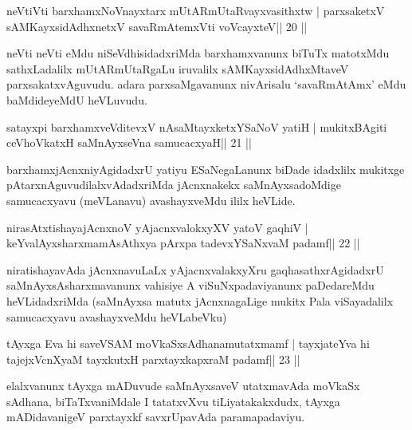 \begin{shl}
neVtiVti barxhamxNoV\s nayxtarx mUtARmUtaRvayxvasithxtw |
parxsaketxV sAMKayxsidAdhxnetxV savaRmAtemxVti voVcayxteV\hfill || 20 ||
\end{shl}

\begin{artha}
neVti neVti eMdu niSeVdhisidadxriMda barxhamxvanunx biTuTx matotxMdu sathxLadalilx mUtARmUtaRgaLu iruvalilx sAMKayxsidAdhxMtaveV parxsakatxvAguvudu. adara parxsaMgavanunx nivArisalu `savaRmAtAmx' eMdu baMdideyeMdU heVLuvudu.
\end{artha}


\begin{shl}
satayxpi barxhamxveVditevxV nAsaMtayxketxYSaNoV yatiH |
mukitxBAgiti ceVhoVkatxH saMnAyxseVna samucacxyaH\hfill || 21 ||
\end{shl}

\begin{artha}
barxhamxjAcnxniyAgidadxrU yatiyu ESaNegaLanunx biDade idadxlilx mukitxge pAtarxnAguvudilalxvAdadxriMda jAcnxnakekx saMnAyxsadoMdige samucacxyavu (meVLanavu) avashayxveMdu ililx heVLide.
\end{artha}

\begin{shl}
nirasAtxtishayajAcnxnoV yAjacnxvalokxyXV yatoV gaqhiV |
keYvalAyxsharxmamAsAthxya pArxpa tadevxYSaNxvaM padamf\hfill || 22 ||
\end{shl}

\begin{artha}
niratishayavAda jAcnxnavuLaLx yAjacnxvalakxyXru gaqhasathxrAgidadxrU
saMnAyxsAsharxmavanunx vahisiye A viSuNxpadaviyanunx paDedareMdu
heVLidadxriMda (saMnAyxsa matutx jAcnxnagaLige mukitx Pala
viSayadalilx samucacxyavu avashayxveMdu heVLabeVku)
\end{artha}


\begin{shl}
tAyxga Eva hi saveVSAM moVkaSxsAdhanamutatxmamf |
tayxjateYva hi tajejxVcnXyaM tayxkutxH parxtayxkapxraM padamf\hfill || 23 ||
\end{shl}

\begin{artha}
elalxvanunx tAyxga mADuvude saMnAyxsaveV utatxmavAda moVkaSx sAdhana, biTaTxvaniMdale I tatatxvXvu tiLiyatakakxdudx, tAyxga mADidavanigeV parxtayxkf savxrUpavAda paramapadaviyu.
\end{artha}

